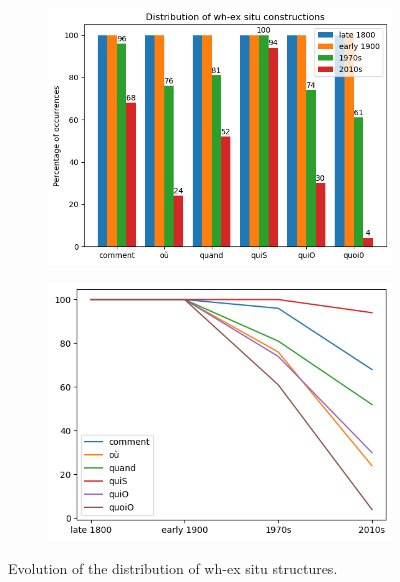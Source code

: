 \documentclass[fleqn,10pt]{wlscirep}
\begin{document}
\begin{figure}[h!]
    \centering
    \begin{subfigure}[b]{0.49\linewidth}
      \includegraphics[width=\linewidth]{images/exsitu.png}
    \end{subfigure}
    \begin{subfigure}[b]{0.49\linewidth}
      \includegraphics[width=\linewidth]{images/exsitu2.png}
    \end{subfigure}
    \caption{Evolution of the distribution of wh-ex situ structures.}
    \label{fig:ex situ}
  \end{figure}
\end{document}
